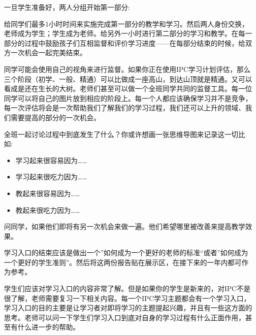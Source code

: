     一旦学生准备好，两人分组开始第一部分:\par
    给同学们最多1小时时间来实施完成第一部分的教学和学习。然后两人身份交换，老师成为学生；学生成为老师。给另外一小时进行第二部分的学习和教学。在每一部分的过程中鼓励孩子们互相监督和评价学习进度——在每部分结束的时候，给双方一次机会一起完美结束。\par
    同学可能会使用自己的视角来进行监督。如果你正在使用IPC学习计划评估，那么三个阶段（初学、一般、精通）可以比做成一座高山，到达山顶就是精通。又可以看成是还在生长的大树。老师们甚至可以做一个全班同学共同的监督工具。每一位同学可以将自己的图片放到相应的阶段上。每一个人都应该确保学习并不是竞争，每一次评估将会是一次帮助我们了解我们的学习过程，我们还可以上升的领域、我们需要提高的部分的一次机会。\par
    全班一起讨论过程中到底发生了什么？你或许想画一张思维导图来记录这一切比如:\par
    \begin{itemize}
      \item 学习起来很容易因为……
      \item 学习起来很吃力因为……
      \item 教起来很容易因为……
      \item 教起来很吃力因为……
    \end{itemize} 
    问同学，如果他们即将有另一次机会来做一遍。他们希望哪里被改善来提高教学效果。\par
    学习入口的结束应该是做出一个”如何成为一个更好的老师的标准“或者”如何成为一个更好的学生准则”。然后将这两份报告贴在展示区，在接下来的一年内都可作为参考。\par
    学生们应该对学习入口的内容非常了解。但是如果你的学生是新来的，对IPC不是很了解，老师需要复习一下相关内容。每一个IPC学习主题都会有一个学习入口，学习入口的目的主要是让学习者对即将学习的主题提起兴趣，并且有一些这方面的思考。老师可以问一下学生们学习入口到底对自身的学习过程有什么正面作用，甚至有什么进一步的帮助。\par
    
    
